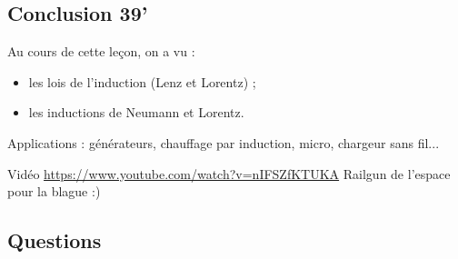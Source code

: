 \subsection*{Conclusion 39'}

Au cours de cette leçon, on a vu :
\begin{itemize}
\item les lois de l'induction (Lenz et Lorentz) ;
\item les inductions de Neumann et Lorentz.
\end{itemize}

\begin{slide}
Applications : générateurs, chauffage par induction, micro, chargeur sans fil...
\end{slide}

\begin{slide}
Vidéo \url{https://www.youtube.com/watch?v=nIFSZfKTUKA} Railgun de l'espace pour la blague :)	
\end{slide}


\subsection*{Questions}

